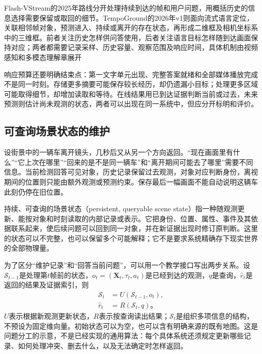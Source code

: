 Flash-VStream的2025年路线分开处理持续到达的帧和用户问题，用概括历史的信息选择需要保留或取回的细节。TempoGround的2026年v1则面向流式语言定位，关联相邻帧对象，预测进入、持续或离开的存在状态，再形成二维框及相机坐标系中的三维框。前者关注历史怎样供问答使用，后者关注语言目标怎样随到达画面保持对应；两者都需要记录采样、历史容量、观察范围及响应时间，具体机制由视频感知和多模态理解章展开

响应预算还要明确结束点：第一文字单元出现、完整答案就绪和全部媒体播放完成不是同一时刻。存储更多摘要可能保存较长经历，却仍遗漏小目标；处理更多区域可能取得细节，却增加读取和等待。在线结果用已到达证据判断当前或过去，未来预测则估计尚未观测的状态，两者可以出现在同一系统中，但应分开标明和评价。

\subsection{可查询场景状态的维护}
\label{sec:vision-overview-queryable-state-frontier}

设街景中的一辆车离开镜头，几秒后又从另一个方向返回。“现在画面里有什么”“它上次在哪里”“回来的是不是同一辆车”和“离开期间可能去了哪里”需要不同信息。当前检测回答可见对象，历史记录保留过去观测，对象对应判断身份，离视期间的位置则只能由额外观测或预测约束。保存最后一幅画面不能自动说明这辆车此刻仍停在旧位置。

持续、可查询的场景状态（persistent, queryable scene state）指一种随观测更新、能按对象和时刻读取的内部记录或表示。它把身份、位置、属性、事件及其依据联系起来，使后续问题可以回到同一对象，并在新证据出现时修订原判断。这里的状态可以不完整，也可以保留多个可能解释；它不是要求系统精确存下现实世界的全部物理量。

为了区分“维护记录”和“回答当前问题”，可以用一个教学接口写出两步关系。设$\mathcal{S}_{t-1}$是处理第$t$帧前的状态，$o_t=(\bm{X}_t,\tau_t,a_t)$是已经到达的观测，$q$是查询，$\hat r_t$是返回的结果及证据索引，则
\begin{equation}
  \begin{aligned}
    \mathcal{S}_t&=U(\mathcal{S}_{t-1},o_t),\\
    \hat r_t&=R(\mathcal{S}_t,q)\text{。}
  \end{aligned}
  \label{eq:vision-overview-state-update-query}
\end{equation}
$U$表示根据新观测更新状态，$R$表示按查询读出结果；$\mathcal{S}_t$是组织多项信息的结构，不预设为固定维向量。初始状态可以为空，也可以含有明确来源的既有地图。这是问题分工的示意，不是已经实现的通用算法：每个具体系统还须规定更新哪些记录、如何处理冲突、删去什么，以及无法确定时怎样返回。

